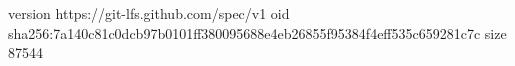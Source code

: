 version https://git-lfs.github.com/spec/v1
oid sha256:7a140c81c0dcb97b0101ff380095688e4eb26855f95384f4eff535c659281c7c
size 87544
